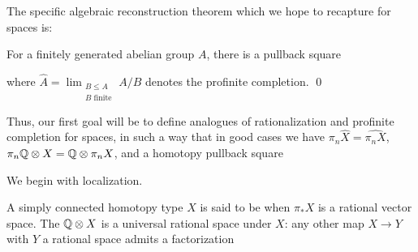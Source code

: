 The specific algebraic reconstruction theorem which we hope to recapture for spaces is:
\begin{theorem}
For a finitely generated abelian group $A$,
there is a pullback square
\begin{center}
\end{center}
where $\widehat A = \lim_{\substack{B \le A \\ \text{$B$ finite}}} A / B$ denotes the profinite completion. \qed
\end{theorem}

\noindent
Thus, our first goal will be to define analogues of rationalization and profinite completion for spaces, in such a way that in good cases we have $\pi_n \widehat X = \widehat{\pi_n X}$, $\pi_n \mathbb Q \otimes X = \mathbb Q \otimes \pi_n X$, and a homotopy pullback square
\begin{center}
\end{center}

We begin with localization.

\begin{definition}
A simply connected homotopy type $X$ is said to be  when $\pi_* X$ is a rational vector space.
The  $\mathbb Q \otimes X$ is a universal rational space under $X$: any other map $X \to Y$ with $Y$ a rational space admits a factorization
\begin{center}
\end{center}
\end{definition}

